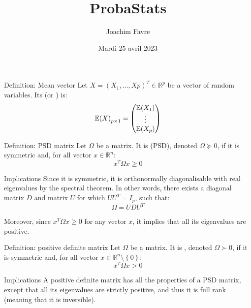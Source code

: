 \documentclass[a4paper]{article}
\title{ProbaStats}
\author{Joachim Favre}
\date{Mardi 25 avril 2023}
\begin{document}
\maketitle


\begin{parag}{Definition: Mean vector}
    Let $X = \left(X_1, \ldots, Xp\right)^T \in \mathbb{R}^{p}$ be a vector of random variables. Its  (or ) is: 
    \[\exval\left(X\right)_{p \times 1} = \begin{pmatrix} \exval\left(X_1\right) \\ \vdots \\ \exval\left(X_p\right) \end{pmatrix} \]
\end{parag}

\begin{parag}{Definition: PSD matrix}
    Let $\Omega$ be a matrix. It is  (PSD), denoted $\Omega \succeq 0$, if it is symmetric and, for all vector $x \in \mathbb{R}^n$: 
    \[x^T \Omega x \geq 0\]
    
    \begin{subparag}{Implications}
        Since it is symmetric, it is orthonormally diagonalisable with real eigenvalues by the spectral theorem. In other words, there exists a diagonal matrix $D$ and matrix $U$ for which $UU^T = I_p$, such that: 
        \[\Omega = U D U ^T\]

        Moreover, since $x^T \Omega x \geq 0$ for any vector $x$, it implies that all its eigenvalues are positive.
    \end{subparag}
\end{parag}

\begin{parag}{Definition: positive definite matrix}
    Let $\Omega$ be a matrix. It is , denoted $\Omega \succ 0$, if it is symmetric and, for all vector $x \in \mathbb{R}^n \setminus \left\{0\right\}$: 
    \[x^T \Omega x > 0\]
    
    \begin{subparag}{Implications}
        A positive definite matrix has all the properties of a PSD matrix, except that all its eigenvalues are strictly positive, and thus it is full rank (meaning that it is inversible).
    \end{subparag}
\end{parag}
\end{document}
